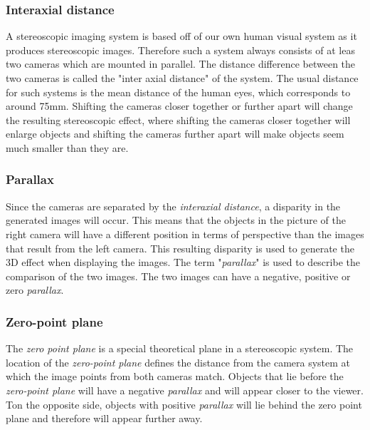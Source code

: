 \subsubsection{Interaxial distance}
A stereoscopic imaging system is based off of our own human visual system as it produces stereoscopic images. Therefore such a system always consists of at leas two cameras which are mounted in parallel. The distance difference between the two cameras is called the "inter axial distance" of the system. The usual distance for such systems is the mean distance of the human eyes, which corresponds to around 75mm. Shifting the cameras closer together or further apart will change the resulting stereoscopic effect, where shifting the cameras closer together will enlarge objects and shifting the cameras further apart will make objects seem much smaller than they are. 
\subsubsection{Parallax}
Since the cameras are  separated by the \textit{interaxial distance}, a disparity in the generated images will occur. This means that the objects in the picture of the right camera will have a different position in terms of perspective than the images that result from the left camera. This resulting disparity is used to generate the 3D effect when displaying the images. The term "\textit{parallax}" is used to describe the comparison of the two images. The two images can have a negative, positive or zero \textit{parallax}.

\subsubsection{Zero-point plane}
The\textit{ zero point plane} is a special theoretical plane in a stereoscopic system. The location of the \textit{zero-point plane} defines the distance from the camera system at which the image points from both cameras match. Objects that lie before the \textit{zero-point plane} will have a negative \textit{parallax} and will appear closer to the viewer. Ton the opposite side, objects with positive \textit{parallax} will lie behind the zero point plane and therefore will appear further away.

